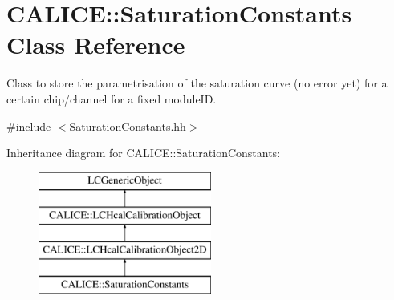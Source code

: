 \section{C\-A\-L\-I\-C\-E\-:\-:Saturation\-Constants Class Reference}
\label{classCALICE_1_1SaturationConstants}


Class to store the parametrisation of the saturation curve (no error yet) for a certain chip/channel for a fixed module\-I\-D.  




{\ttfamily \#include $<$Saturation\-Constants.\-hh$>$}

Inheritance diagram for C\-A\-L\-I\-C\-E\-:\-:Saturation\-Constants\-:\begin{figure}[H]
\begin{center}
\leavevmode
\includegraphics[height=4.000000cm]{classCALICE_1_1SaturationConstants}
\end{center}
\end{figure}
